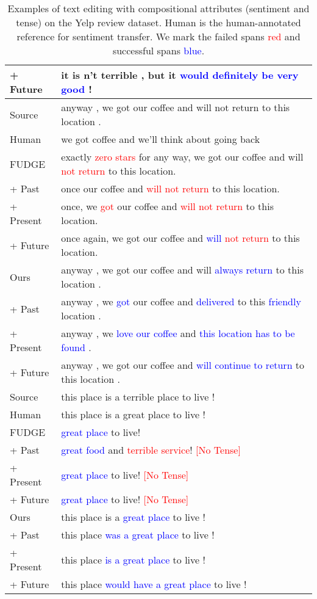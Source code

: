 \documentclass[11pt]{article}
\newcommand{\tenc}[1]{\textcolor{blue}{#1}}
\newcommand{\senc}[1]{\textcolor{red}{#1}}
\begin{document}
\begin{table}[ht]
\begin{tabular}{lp{13cm}}
\quad +  Future&it is n't terrible , but it \tenc{would definitely be very good} !\\
\midrule[1pt]
Source&anyway , we got our coffee and will not return to this location .\\
Human&we got coffee and we'll think about going back\\
\midrule
FUDGE&exactly \senc{zero stars} for any way, we got our coffee and will \senc{not return} to this location.\\
\quad + Past&once our coffee and \senc{will not return} to this location.\\
\quad + Present&once, we \senc{got} our coffee and \senc{will not return} to this location.\\
\quad + Future&once again, we got our coffee and \tenc{will} \senc{not return} to this location.\\
\midrule
Ours&anyway , we got our coffee and will \tenc{always return} to this location .\\
\quad +  Past&anyway , we \tenc{got} our coffee and \tenc{delivered} to this \tenc{friendly} location .\\
\quad +  Present&anyway , we \tenc{love our coffee} and \tenc{this location has to be found} .\\
\quad +  Future&anyway , we got our coffee and \tenc{will continue to return} to this location .\\
\midrule[1pt]
Source&this place is a terrible place to live !\\
Human&this place is a great place to live !\\
\midrule
FUDGE&\tenc{great place} to live!\\
\quad + Past&\tenc{great food} and \senc{terrible service}! \senc{[No Tense]}\\
\quad + Present&\tenc{great place} to live! \senc{[No Tense]}\\
\quad + Future&\tenc{great place} to live! \senc{[No Tense]}\\
\midrule
Ours&this place is a \tenc{great place} to live !\\
\quad +  Past&this place \tenc{was a great place} to live !\\
\quad +  Present&this place \tenc{is a great place} to live !\\
\quad +  Future&this place \tenc{would have a great place} to live !\\\bottomrule
    \end{tabular}
    \vspace{-5pt}
    \caption{Examples of text editing with compositional attributes (sentiment and tense) on the Yelp review dataset. Human is the human-annotated reference for sentiment transfer. We mark the failed spans \senc{red} and successful spans \tenc{blue}.}
    \label{tab:example_tst_yelp}
\end{table}
\end{document}
